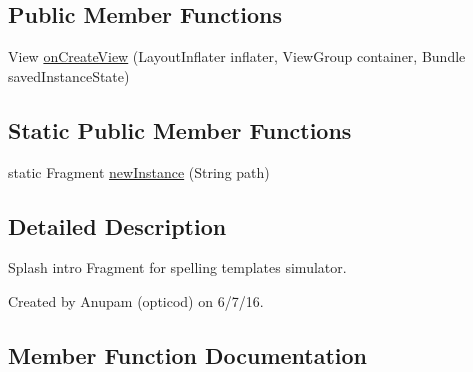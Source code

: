 \subsection*{Public Member Functions}
\begin{DoxyCompactItemize}
\item 
View \hyperlink{classorg_1_1buildmlearn_1_1toolkit_1_1learnspelling_1_1fragment_1_1SplashFragment_a6128fd0fa9e257aaae2f7f7dcbdef559}{on\+Create\+View} (Layout\+Inflater inflater, View\+Group container, Bundle saved\+Instance\+State)
\end{DoxyCompactItemize}
\subsection*{Static Public Member Functions}
\begin{DoxyCompactItemize}
\item 
static Fragment \hyperlink{classorg_1_1buildmlearn_1_1toolkit_1_1learnspelling_1_1fragment_1_1SplashFragment_a2023bb92d56b04ca382da2472a6965f5}{new\+Instance} (String path)
\end{DoxyCompactItemize}


\subsection{Detailed Description}
Splash intro Fragment for spelling template\textquotesingle{}s simulator. 

Created by Anupam (opticod) on 6/7/16. 

\subsection{Member Function Documentation}
